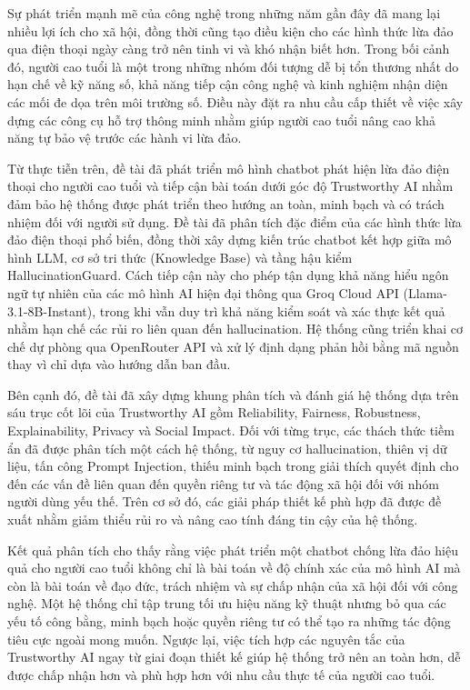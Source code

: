 Sự phát triển mạnh mẽ của công nghệ trong những năm gần đây đã mang lại nhiều lợi ích cho xã hội, đồng thời cũng tạo điều kiện cho các hình thức lừa đảo qua điện thoại ngày càng trở nên tinh vi và khó nhận biết hơn. Trong bối cảnh đó, người cao tuổi là một trong những nhóm đối tượng dễ bị tổn thương nhất do hạn chế về kỹ năng số, khả năng tiếp cận công nghệ và kinh nghiệm nhận diện các mối đe dọa trên môi trường số. Điều này đặt ra nhu cầu cấp thiết về việc xây dựng các công cụ hỗ trợ thông minh nhằm giúp người cao tuổi nâng cao khả năng tự bảo vệ trước các hành vi lừa đảo.

Từ thực tiễn trên, đề tài đã phát triển mô hình chatbot phát hiện lừa đảo điện thoại cho người cao tuổi và tiếp cận bài toán dưới góc độ Trustworthy AI nhằm đảm bảo hệ thống được phát triển theo hướng an toàn, minh bạch và có trách nhiệm đối với người sử dụng.
Đề tài đã phân tích đặc điểm của các hình thức lừa đảo điện thoại phổ biến, đồng thời xây dựng kiến trúc chatbot kết hợp giữa mô hình LLM, cơ sở tri thức (Knowledge Base) và tầng hậu kiểm HallucinationGuard. Cách tiếp cận này cho phép tận dụng khả năng hiểu ngôn ngữ tự nhiên của các mô hình AI hiện đại thông qua Groq Cloud API (Llama-3.1-8B-Instant), trong khi vẫn duy trì khả năng kiểm soát và xác thực kết quả nhằm hạn chế các rủi ro liên quan đến hallucination. Hệ thống cũng triển khai cơ chế dự phòng qua OpenRouter API và xử lý định dạng phản hồi bằng mã nguồn thay vì chỉ dựa vào hướng dẫn ban đầu.

Bên cạnh đó, đề tài đã xây dựng khung phân tích và đánh giá hệ thống dựa trên sáu trục cốt lõi của Trustworthy AI gồm Reliability, Fairness, Robustness, Explainability, Privacy và Social Impact. Đối với từng trục, các thách thức tiềm ẩn đã được phân tích một cách hệ thống, từ nguy cơ hallucination, thiên vị dữ liệu, tấn công Prompt Injection, thiếu minh bạch trong giải thích quyết định cho đến các vấn đề liên quan đến quyền riêng tư và tác động xã hội đối với nhóm người dùng yếu thế. Trên cơ sở đó, các giải pháp thiết kế phù hợp đã được đề xuất nhằm giảm thiểu rủi ro và nâng cao tính đáng tin cậy của hệ thống.

Kết quả phân tích cho thấy rằng việc phát triển một chatbot chống lừa đảo hiệu quả cho người cao tuổi không chỉ là bài toán về độ chính xác của mô hình AI mà còn là bài toán về đạo đức, trách nhiệm và sự chấp nhận của xã hội đối với công nghệ. Một hệ thống chỉ tập trung tối ưu hiệu năng kỹ thuật nhưng bỏ qua các yếu tố công bằng, minh bạch hoặc quyền riêng tư có thể tạo ra những tác động tiêu cực ngoài mong muốn. Ngược lại, việc tích hợp các nguyên tắc của Trustworthy AI ngay từ giai đoạn thiết kế giúp hệ thống trở nên an toàn hơn, dễ được chấp nhận hơn và phù hợp hơn với nhu cầu thực tế của người cao tuổi.

